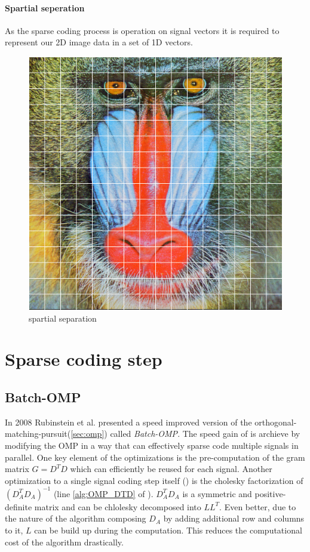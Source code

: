 \paragraph{Spartial seperation}
As the sparse coding process is operation on signal vectors it is required to
represent our 2D image data in a set of 1D vectors. 

\begin{figure}[h]
\centering
\includegraphics[scale = 0.25]{images/segmentation.png}
\caption{spartial separation}
\label{fig:spartial}
\end{figure}

\section{Sparse coding step}


\subsection{Batch-OMP}
In 2008 Rubinstein et al.\cite{Rubinstein2008} presented a speed improved
version of the orthogonal-matching-pursuit(\ref{sec:omp}) called
\emph{Batch-OMP}. The speed gain of  is archieve
by modifying the OMP in a way that can effectively sparse code
multiple signals in parallel. One key element of the optimizations is the
pre-computation of the gram matrix $G=D^TD$ which can efficiently be reused
for each signal. Another optimization to a single signal coding step itself
() is the cholesky factorization of $\left( D_A^T D_A
\right)^{-1}$ (line \ref{alg:OMP_DTD} of ). $D_A^T
D_A$ is a symmetric and positive-definite matrix and can be chlolesky decomposed
into $LL^T$. Even better, due to the nature of the algorithm composing $D_A$
by adding additional row and columns to it, $L$ can be build up during the
computation. This reduces the computational cost of the algorithm drastically.
 
